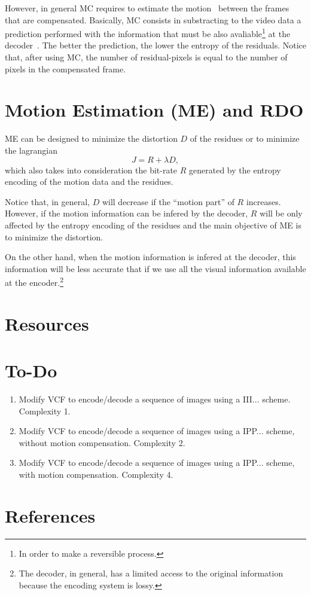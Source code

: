 However, in general MC requires to estimate the
motion~\cite{vruiz__ME} between the frames that are
compensated. Basically, MC consists in substracting to the video data
a prediction performed with the information that must be also
avaliable\footnote{In order to make a reversible process.} at the
decoder~\cite{vruiz__MCT}. The better the prediction, the lower the
entropy of the residuals. Notice that, after using MC, the number of
residual-pixels is equal to the number of pixels in the compensated
frame.


\section{Motion Estimation (ME) and RDO}

ME can be designed to minimize the distortion $D$ of the residues or
to minimize the lagrangian
\begin{equation}
  J = R + \lambda D,
\end{equation}
which also takes into consideration the bit-rate $R$ generated by the
entropy encoding of the motion data and the residues.

Notice that, in general, $D$ will decrease if the ``motion part'' of
$R$ increases. However, if the motion information can be infered by
the decoder, $R$ will be only affected by the entropy encoding of the
residues and the main objective of ME is to minimize the distortion.

On the other hand, when the motion information is infered at the
decoder, this information will be less accurate that if we use all the
visual information available at the encoder.\footnote{The decoder, in
general, has a limited access to the original information because the
encoding system is lossy.}


\section{Resources}

\section{To-Do}

\begin{enumerate}
\item Modify VCF to encode/decode a sequence of images using a
  III... scheme. Complexity 1.
\item Modify VCF to encode/decode a sequence of images using a
  IPP... scheme, without motion compensation. Complexity 2.
\item Modify VCF to encode/decode a sequence of images using a
  IPP... scheme, with motion compensation. Complexity 4.
\end{enumerate}

  
\section{References}

\renewcommand{\addcontentsline}[3]{}%


